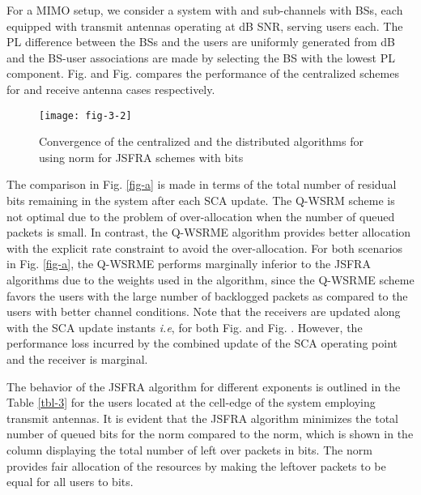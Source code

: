 For a \ac{MIMO} setup, we consider a system with  and  sub-channels with  \acp{BS}, each equipped with  transmit antennas operating at dB \ac{SNR}, serving  users each. The \ac{PL} difference between the \acp{BS} and the users are uniformly generated from \me{[0,-3]} dB and the \ac{BS}-user associations are made by selecting the \ac{BS} with the lowest \ac{PL} component. Fig.  and Fig.  compares the performance of the centralized schemes for  and  receive antenna cases respectively.
\begin{figure}
	\centering
	\texttt{[image: fig-3-2]}
	\vspace{-0.3in}
	\caption{Convergence of the centralized and the distributed algorithms for  using  norm for \ac{JSFRA} schemes with  bits}
	\label{fig-d}
\end{figure}

The comparison in Fig. \ref{fig-a} is made in terms of the total number of residual bits remaining in the system after each \ac{SCA} update. The \ac{Q-WSRM} scheme is not optimal due to the problem of over-allocation when the number of queued packets is small. In contrast, the \ac{Q-WSRME} algorithm provides better allocation with the explicit rate constraint to avoid the over-allocation. For both scenarios in Fig. \ref{fig-a}, the \ac{Q-WSRME} performs marginally inferior to the \ac{JSFRA} algorithms due to the weights used in the algorithm, since the \ac{Q-WSRME} scheme favors the users with the large number of backlogged packets as compared to the users with better channel conditions. Note that the receivers are updated along with the \ac{SCA} update instants \textit{i.e},  for both Fig.  and Fig. . However, the performance loss incurred by the combined update of the \ac{SCA} operating point and the receiver is marginal.

The behavior of the \ac{JSFRA} algorithm for different exponents  is outlined in the Table \ref{tbl-3} for the users located at the cell-edge of the system employing  transmit antennas. It is evident that the \ac{JSFRA} algorithm minimizes the total number of queued bits for the  norm compared to the  norm, which is shown in the column displaying the total number of left over packets \me{\chi} in bits. The \me{\ell_{\infty}} norm provides fair allocation of the resources by making the leftover packets to be equal for all users to  bits.
